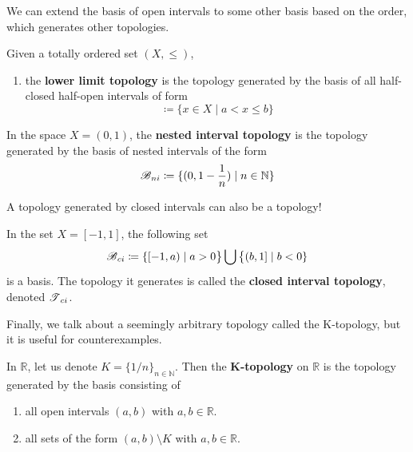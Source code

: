  We can extend the basis of open intervals to some other basis based on the order, which generates other topologies. 

  \begin{example}
    Given a totally ordered set $(X, \leq)$, 
    \begin{enumerate}
      \item the \textbf{lower limit topology} is the topology generated by the basis of all half-closed half-open intervals of form 
      \begin{equation}
        [a, b) \coloneqq \{ x \in X \mid a \leq x < b \}
      \end{equation}
      \item the \textbf{upper limit topology} is the topology generated by the basis of all half-open half-closed intervals of form 
      \begin{equation}
        (a, b] \coloneqq \{ x \in X \mid a < x \leq b \}
      \end{equation}
    \end{enumerate}
  \end{example}

  \begin{example}
    In the space $X = (0,1)$, the \textbf{nested interval topology} is the topology generated by the basis of nested intervals of the form 
    \begin{equation}
      \B_{ni} \coloneqq \{ (0, 1-\frac{1}{n}) \mid n \in \mathbb{N} \}
    \end{equation}
  \end{example}

  A topology generated by closed intervals can also be a topology! 

  \begin{example}
    In the set $X = [-1, 1]$, the following set 
    \begin{equation}
      \B_{ci} \coloneqq \{ [-1, a) \mid a > 0 \big\} \bigcup \big\{ (b, 1] \mid b<0 \}
    \end{equation}
    is a basis. The topology it generates is called the \textbf{closed interval topology}, denoted $\T_{ci}$. 
  \end{example}

  Finally, we talk about a seemingly arbitrary topology called the K-topology, but it is useful for counterexamples.   

  \begin{example}[K-Topology]
    In $\mathbb{R}$, let us denote $K = \{1/n\}_{n \in \mathbb{N}}$. Then the \textbf{K-topology} on $\mathbb{R}$ is the topology generated by the basis consisting of 
    \begin{enumerate}
      \item all open intervals $(a, b)$ with $a, b \in \mathbb{R}$. 
      \item all sets of the form $(a, b) \setminus K$ with $a, b \in \mathbb{R}$. 
    \end{enumerate}
  \end{example} 

